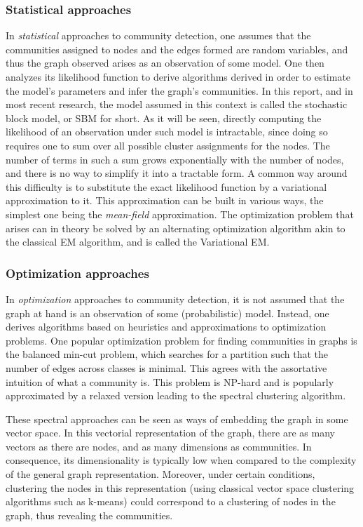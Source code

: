 \documentclass[../../main.tex]{subfiles} %
\begin{document}
\subsubsection{Statistical approaches}
In \textit{statistical} approaches to community detection, one assumes that 
the communities assigned to nodes and the edges formed are random variables, 
and thus the graph observed arises as an observation of some model. One 
then analyzes its likelihood function to derive algorithms derived in order to 
estimate the model's parameters and infer the graph's communities. In this 
report, and in most recent research, the model assumed in this context is 
called the stochastic block model, or SBM for short. As it will be seen, 
directly computing the likelihood of an observation under such model is 
intractable, since doing so requires one to sum over all possible cluster 
assignments for the nodes. The number of terms in such a sum grows 
exponentially with the number of nodes, and there is no way to simplify it into 
a tractable form. A common way around this difficulty is to substitute the 
exact likelihood function by a variational approximation to it. This 
approximation can be built in various ways, the simplest one being the 
\textit{mean-field} approximation. The optimization problem that arises can in 
theory be solved by an alternating optimization algorithm akin to the classical 
EM algorithm, and is called the Variational EM.

\subsubsection{Optimization approaches}
In \textit{optimization} approaches to community 
detection, it is not assumed that 
the graph at hand is an observation of some (probabilistic) model. Instead, one 
derives algorithms based on heuristics and 
approximations to optimization
problems. One popular optimization problem for 
finding communities in graphs is the balanced 
min-cut problem, which searches for a partition 
such that the number of edges across classes is 
minimal. This agrees with the assortative intuition of 
what a community is. This problem is NP-hard and is 
popularly approximated by a relaxed version leading 
to the spectral clustering algorithm.

These spectral approaches can be seen as ways of 
embedding the graph in some vector space. In this 
vectorial representation of the graph, there are as 
many vectors as there are nodes, and as many 
dimensions as communities. In consequence, its 
dimensionality is typically low when compared to the 
complexity of the general graph representation. 
Moreover, under certain conditions, clustering the 
nodes in this representation (using classical vector 
space clustering algorithms such as k-means) could 
correspond to a clustering of nodes in the graph, 
thus revealing the communities.
\end{document}
